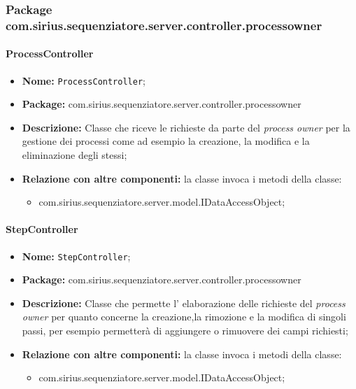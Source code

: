 \subsubsection{Package com.sirius.sequenziatore.server.controller.processowner}
\paragraph{ProcessController}
	\begin{itemize}
		\item \textbf{Nome:} \texttt{ProcessController};
		\item \textbf{Package:} com.sirius.sequenziatore.server.controller.processowner
		\item \textbf{Descrizione:} Classe che riceve le richieste da parte del \textit{process owner} per la gestione dei processi come ad esempio la creazione, la modifica e la eliminazione degli stessi;
		\item \textbf{Relazione con altre componenti:} la classe invoca i metodi della classe:
		\begin{itemize}
			\item com.sirius.sequenziatore.server.model.IDataAccessObject;
		\end{itemize}
	\end{itemize}
\paragraph{StepController}
	\begin{itemize}
		\item \textbf{Nome:} \texttt{StepController};
		\item \textbf{Package:} com.sirius.sequenziatore.server.controller.processowner
		\item \textbf{Descrizione:} Classe che permette l' elaborazione delle richieste del \textit{process owner} per quanto concerne la creazione,la rimozione e la modifica di singoli passi, per esempio permetterà di aggiungere o rimuovere dei campi richiesti;
		\item \textbf{Relazione con altre componenti:} la classe invoca i metodi della classe:
		\begin{itemize}
			\item com.sirius.sequenziatore.server.model.IDataAccessObject;
		\end{itemize}
	\end{itemize}
